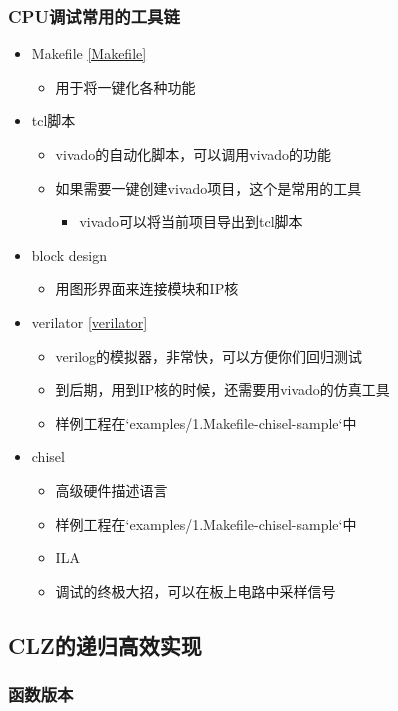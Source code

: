 \documentclass[lang=cn,11pt,a4paper]{elegantpaper}
\begin{document}
\subsubsection{CPU调试常用的工具链}
\begin{itemize}
\item Makefile \ref{Makefile}
  \begin{itemize}
  \item 用于将一键化各种功能
  \end{itemize}
\item tcl脚本
  \begin{itemize}
  \item vivado的自动化脚本，可以调用vivado的功能
  \item 如果需要一键创建vivado项目，这个是常用的工具
    \begin{itemize}
    \item vivado可以将当前项目导出到tcl脚本
    \end{itemize}
  \end{itemize}
\item block design
  \begin{itemize}
  \item 用图形界面来连接模块和IP核
  \end{itemize}
\item verilator \ref{verilator}
  \begin{itemize}
  \item verilog的模拟器，非常快，可以方便你们回归测试
  \item 到后期，用到IP核的时候，还需要用vivado的仿真工具
  \item 样例工程在`examples/1.Makefile-chisel-sample`中
  \end{itemize}
\item chisel
  \begin{itemize}
  \item 高级硬件描述语言
  \item 样例工程在`examples/1.Makefile-chisel-sample`中
\item ILA
  \item 调试的终极大招，可以在板上电路中采样信号
  \end{itemize}
\end{itemize}

\subsection{CLZ的递归高效实现}
\subsubsection{函数版本}
\end{document}
